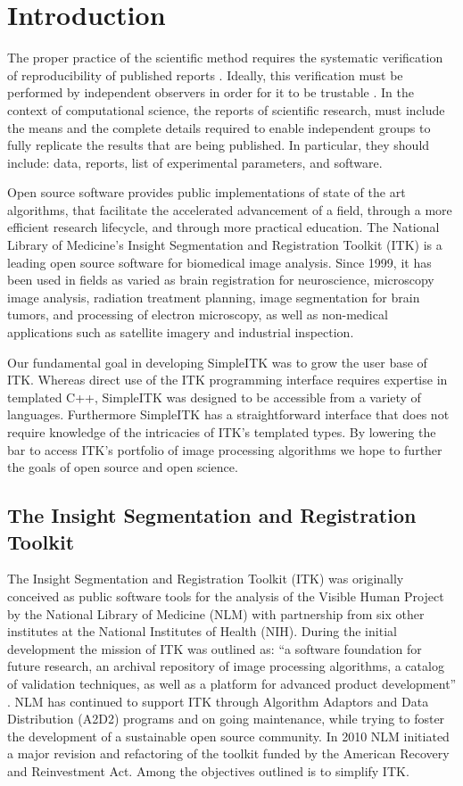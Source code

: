 \documentclass{frontiersMED} %
\begin{document}
\section{Introduction}
The proper practice of the scientific method requires the systematic
verification of reproducibility of published reports
\cite{Popper1934}. Ideally, this verification must be performed by
independent observers in order for it to be trustable \cite{Popper1968}. In
the context of computational science, the reports of scientific
research, must include the means and the complete details required to
enable independent groups to fully replicate the results that are
being published. In particular, they should include: data, reports,
list of experimental parameters, and software.

Open source software provides public implementations of state of the
art algorithms, that facilitate the accelerated advancement of a
field, through a more efficient research lifecycle, and through more
practical education. The National Library of Medicine’s Insight
Segmentation and Registration Toolkit (ITK) is a leading open source
software for biomedical image analysis. Since 1999, it has been used
in fields as varied as brain registration for neuroscience, microscopy
image analysis, radiation treatment planning, image segmentation for
brain tumors, and processing of electron microscopy, as well as
non-medical applications such as satellite imagery and industrial
inspection.

Our fundamental goal in developing SimpleITK was to grow the user base
of ITK.  Whereas direct use of the ITK programming interface requires
expertise in templated C++, SimpleITK was designed to be accessible
from a variety of languages.  Furthermore SimpleITK has a
straightforward interface that does not require knowledge of the
intricacies of ITK’s templated types. By lowering the bar to access
ITK’s portfolio of image processing algorithms we hope to further the
goals of open source and open science.

\subsection{The Insight Segmentation and Registration Toolkit}

The Insight Segmentation and Registration Toolkit (ITK) was originally
conceived as public software tools for the analysis of the Visible
Human Project by the National Library of Medicine (NLM) with
partnership from six other institutes at the National Institutes of
Health (NIH). During the initial development the mission of ITK was
outlined as: “a software foundation for future research, an archival
repository of image processing algorithms, a catalog of validation
techniques, as well as a platform for advanced product development”
\cite{Yoo2002}. NLM has continued to support ITK through Algorithm Adaptors
and Data Distribution (A2D2) programs and on going maintenance, while
trying to foster the development of a sustainable open source
community. In 2010 NLM initiated a major revision and refactoring of
the toolkit funded by the American Recovery and Reinvestment
Act. Among the objectives outlined is to simplify ITK.
\end{document}
